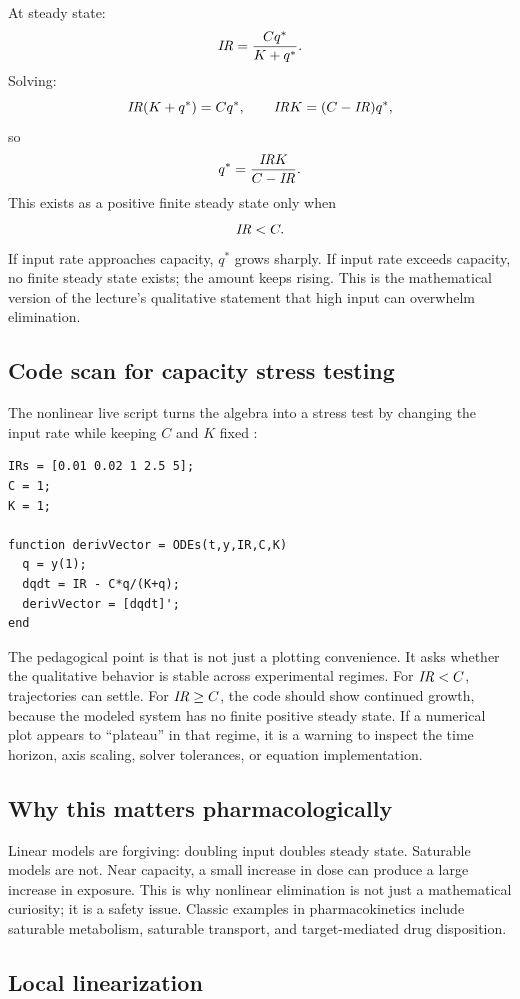 \documentclass[a4paper]{article}
\newcommand{\IRate}{\ensuremath{\pksym{IR}}}
\newcommand{\code}[1]{\texttt{\detokenize{#1}}}
\begin{document}
At steady state:
\[
  \IRate=\frac{Cq^*}{K+q^*}.
\]
Solving:
\[
  \IRate(K+q^*)=Cq^*,
  \qquad
  \IRate K=(C-\IRate)q^*,
\]
so
\[
  q^*=\frac{\IRate K}{C-\IRate}.
\]
This exists as a positive finite steady state only when
\[
  \IRate<C.
\]
If input rate approaches capacity, \(q^*\) grows sharply. If input rate exceeds capacity, no finite steady state exists; the amount keeps rising. This is the mathematical version of the lecture's qualitative statement that high input can overwhelm elimination.

\subsection{Code scan for capacity stress testing}

The nonlinear live script turns the algebra into a stress test by changing the input rate while keeping \(C\) and \(K\) fixed \cite{bmeg671MatlabNonlinearStability2025}:
\begin{verbatim}
IRs = [0.01 0.02 1 2.5 5];
C = 1;
K = 1;

function derivVector = ODEs(t,y,IR,C,K)
  q = y(1);
  dqdt = IR - C*q/(K+q);
  derivVector = [dqdt]';
end
\end{verbatim}
The pedagogical point is that \code{IRs} is not just a plotting convenience. It asks whether the qualitative behavior is stable across experimental regimes. For \(\IRate<C\), trajectories can settle. For \(\IRate\ge C\), the code should show continued growth, because the modeled system has no finite positive steady state. If a numerical plot appears to ``plateau'' in that regime, it is a warning to inspect the time horizon, axis scaling, solver tolerances, or equation implementation.

\subsection{Why this matters pharmacologically}

Linear models are forgiving: doubling input doubles steady state. Saturable models are not. Near capacity, a small increase in dose can produce a large increase in exposure. This is why nonlinear elimination is not just a mathematical curiosity; it is a safety issue. Classic examples in pharmacokinetics include saturable metabolism, saturable transport, and target-mediated drug disposition.

\subsection{Local linearization}
\end{document}
